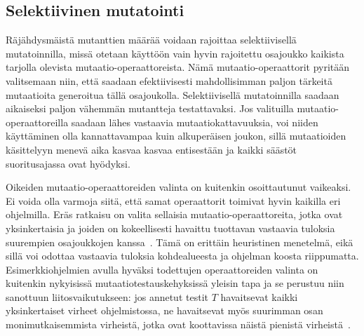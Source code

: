 \documentclass[finnish]{tktltiki2}
\begin{document}
\subsection{Selektiivinen mutatointi}
Räjähdysmäistä mutanttien määrää voidaan rajoittaa selektiivisellä mutatoinnilla, missä otetaan käyttöön vain hyvin rajoitettu osajoukko kaikista tarjolla olevista mutaatio-operaattoreista. Nämä mu\-taa\-tio\--ope\-raatto\-rit pyritään valitsemaan niin, että saadaan efektiivisesti mahdollisimman paljon tärkeitä mutaatioita generoitua tällä osajoukolla. Selektiivisellä mutatoinnilla saadaan aikaiseksi paljon vähemmän mutantteja testattavaksi. Jos valituilla mutaatio-operaattoreilla saadaan lähes vastaavia mutaatiokattavuuksia, voi niiden käyttäminen olla kannattavampaa kuin alkuperäisen joukon, sillä mutaatioiden käsittelyyn menevä aika kasvaa kasvaa entisestään ja kaikki säästöt suoritusajassa ovat hyödyksi.

Oikeiden mutaatio-operaattoreiden valinta on kuitenkin osoittautunut vaikeaksi. Ei voida olla varmoja siitä, että samat operaattorit toimivat hyvin kaikilla eri ohjelmilla. Eräs ratkaisu on valita sellaisia mutaatio-operaattoreita, jotka ovat yksinkertaisia ja joiden on kokeellisesti havaittu tuottavan vastaavia tuloksia suurempien osajoukkojen kanssa~\cite{GrunSZ09}. Tämä on erittäin heuristinen menetelmä, eikä sillä voi odottaa vastaavia tuloksia kohdealueesta ja ohjelman koosta riippumatta. Esimerkkiohjelmien avulla hyväksi todettujen operaattoreiden valinta on kuitenkin nykyisissä mutaatiotestauskehyksissä yleisin tapa ja se perustuu niin sanottuun liitosvaikutukseen: jos annetut testit $T$ havaitsevat kaikki yksinkertaiset virheet ohjelmistossa, ne havaitsevat myös suurimman osan monimutkaisemmista virheistä, jotka ovat koottavissa näistä pienistä virheistä~\cite{DeMilloLS78}. 
\end{document}
